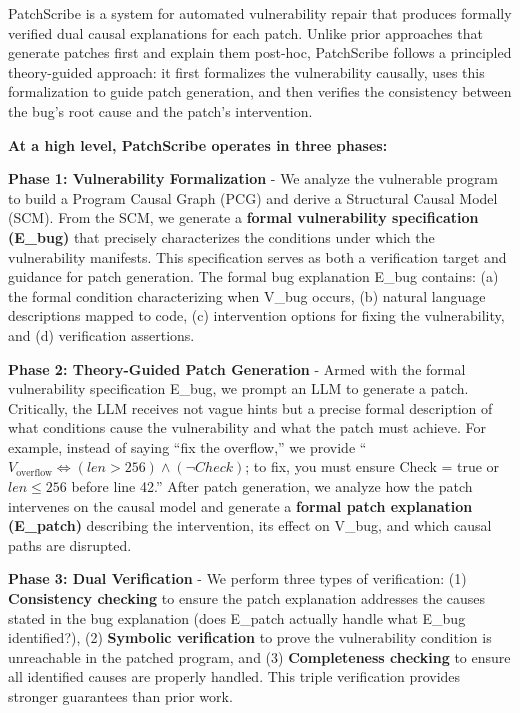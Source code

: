 \documentclass[conference,compsoc]{IEEEtran}
\begin{document}
PatchScribe is a system for automated vulnerability repair that produces
formally verified dual causal explanations for each patch. Unlike prior
approaches that generate patches first and explain them post-hoc,
PatchScribe follows a principled theory-guided approach: it first
formalizes the vulnerability causally, uses this formalization to guide
patch generation, and then verifies the consistency between the bug's
root cause and the patch's intervention.

\textbf{At a high level, PatchScribe operates in three phases:}

\textbf{Phase 1: Vulnerability Formalization} - We analyze the
vulnerable program to build a Program Causal Graph (PCG) and derive a
Structural Causal Model (SCM). From the SCM, we generate a
\textbf{formal vulnerability specification (E\_bug)} that precisely
characterizes the conditions under which the vulnerability manifests.
This specification serves as both a verification target and guidance for
patch generation. The formal bug explanation E\_bug contains: (a) the
formal condition characterizing when V\_bug occurs, (b) natural language
descriptions mapped to code, (c) intervention options for fixing the
vulnerability, and (d) verification assertions.

\textbf{Phase 2: Theory-Guided Patch Generation} - Armed with the formal
vulnerability specification E\_bug, we prompt an LLM to generate a
patch. Critically, the LLM receives not vague hints but a precise formal
description of what conditions cause the vulnerability and what the
patch must achieve. For example, instead of saying ``fix the overflow,''
we provide ``$V_{\text{overflow}} \Leftrightarrow (len > 256) \land (\lnot Check)$; to fix,
you must ensure Check = true or $len \leq 256$ before line 42.'' After patch
generation, we analyze how the patch intervenes on the causal model and
generate a \textbf{formal patch explanation (E\_patch)} describing the
intervention, its effect on V\_bug, and which causal paths are
disrupted.

\textbf{Phase 3: Dual Verification} - We perform three types of
verification: (1) \textbf{Consistency checking} to ensure the patch
explanation addresses the causes stated in the bug explanation (does
E\_patch actually handle what E\_bug identified?), (2) \textbf{Symbolic
verification} to prove the vulnerability condition is unreachable in the
patched program, and (3) \textbf{Completeness checking} to ensure all
identified causes are properly handled. This triple verification
provides stronger guarantees than prior work.
\end{document}
